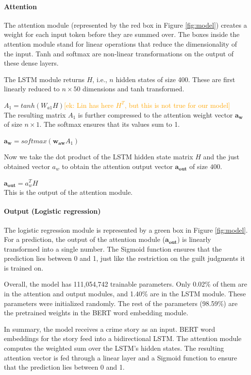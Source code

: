 \documentclass[11pt,a4paper]{article}
\newcommand{\ek}[1]{\textcolor{Orange}{[ek: #1]}}
\begin{document}
\paragraph{Attention}
The attention module (represented by the red box in Figure \ref{fig:model}) creates a weight for each input token before they are summed over. The boxes inside the attention module stand for linear operations that reduce the dimensionality of the input. Tanh and softmax are non-linear transformations on the output of these dense layers.

The LSTM module returns $H$, i.e., $n$ hidden states of size 400. These are first linearly reduced to $n \times 50$ dimensions and tanh transformed. 

$A_1 = tanh(W_{a1} H)$\ek{Lin has here $H^T$, but this is not true for our model}\\
The resulting matrix $A_1$ is further compressed to the attention weight vector $\mathbf{a_w}$ of size $n \times 1$. The softmax ensures that its values sum to 1.

$\mathbf{a_w} = softmax(\mathbf{w_{aw}} A_1)$

Now we take the dot product of the LSTM hidden state matrix $H$ and the just obtained vector $a_w$ to obtain the attention output vector $\mathbf{a_{out}}$ of size $400$. 

$\mathbf{a_{out}} = a_w^T H$\\
This is the output of the attention module.

\paragraph{Output (Logistic regression)}
The logistic regression module is represented by a green box in Figure \ref{fig:model}.
For a prediction, the output of the attention module ($\mathbf{a_{out}}$) is linearly transformed into a single number. 
The Sigmoid function ensures that the prediction lies between 0 and 1, just like the restriction on the guilt judgments it is trained on. 


Overall, the model has 111,054,742 trainable parameters. Only 0.02\% of them are in the attention and output modules, and 1.40\% are in the LSTM module. These parameters were initialized randomly. The rest of the parameters (98.59\%) are the pretrained weights in the BERT word embedding module.

In summary, the model receives a crime story as an input. BERT word embeddings for the story feed into a bidirectional LSTM. The attention module computes the weighted sum over the LSTM's hidden states. The resulting attention vector is fed through a linear layer and a Sigmoid function to ensure that the prediction lies between 0 and 1.
\end{document}
